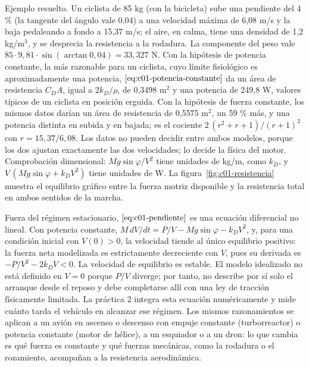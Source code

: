 \documentclass[10pt,openany]{book}
\begin{document}
Ejemplo resuelto. Un ciclista de 85 kg (con la bicicleta) sube una pendiente del 4 \% (la tangente del ángulo vale 0,04) a una velocidad máxima de 6,08 m/s y la baja pedaleando a fondo a 15,37 m/s; el aire, en calma, tiene una densidad de 1,2 kg/m\(^3\), y se desprecia la resistencia a la rodadura. La componente del peso vale \(85\cdot 9{,}81\cdot\sin(\arctan 0{,}04) = 33{,}327\) N. Con la hipótesis de potencia constante, la más razonable para un ciclista, cuyo límite fisiológico es aproximadamente una potencia, \(\eqref{eq:c01-potencia-constante}\) da un área de resistencia \(C_D A\), igual a \(2k_D/\rho\), de 0,3498 m\(^2\) y una potencia de 249,8 W, valores típicos de un ciclista en posición erguida. Con la hipótesis de fuerza constante, los mismos datos darían un área de resistencia de 0,5575 m\(^2\), un 59 \% más, y una potencia distinta en subida y en bajada; es el cociente \(2\,(r^{2} + r + 1)/(r + 1)^{2}\) con \(r = 15{,}37/6{,}08\). Los datos no pueden decidir entre ambos modelos, porque los dos ajustan exactamente las dos velocidades; lo decide la física del motor. Comprobación dimensional: \(Mg\sin\varphi/V^{2}\) tiene unidades de kg/m, como \(k_D\), y \(V\,(Mg\sin\varphi + k_D V^{2})\) tiene unidades de W. La figura~\ref{fig:c01-resistencia} muestra el equilibrio gráfico entre la fuerza motriz disponible y la resistencia total en ambos sentidos de la marcha.

Fuera del régimen estacionario, \(\eqref{eq:c01-pendiente}\) es una ecuación diferencial no lineal. Con potencia constante, \(M\,dV/dt = P/V - Mg\sin\varphi - k_D V^{2}\), y, para una condición inicial con \(V(0)>0\), la velocidad tiende al único equilibrio positivo: la fuerza neta modelizada es estrictamente decreciente con \(V\), pues su derivada es \(-P/V^{2}-2k_DV<0\). La velocidad de equilibrio es estable. El modelo idealizado no está definido en \(V=0\) porque \(P/V\) diverge; por tanto, no describe por sí solo el arranque desde el reposo y debe completarse allí con una ley de tracción físicamente limitada. La práctica 2 integra esta ecuación numéricamente y mide cuánto tarda el vehículo en alcanzar ese régimen. Los mismos razonamientos se aplican a un avión en ascenso o descenso con empuje constante (turborreactor) o potencia constante (motor de hélice), a un esquiador o a un dron: lo que cambia es qué fuerza es constante y qué fuerzas mecánicas, como la rodadura o el rozamiento, acompañan a la resistencia aerodinámica.
\end{document}

